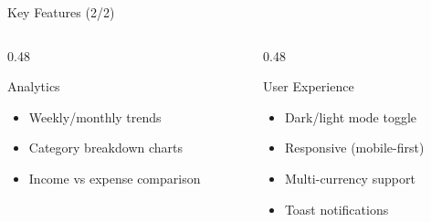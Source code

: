 \documentclass[aspectratio=169, 12pt]{beamer}
\begin{document}
\begin{frame}{Key Features (2/2)}

\begin{columns}[T]
\begin{column}{0.48\textwidth}
\begin{block}{Analytics}
\begin{itemize}\itemsep=0pt
    \item Weekly/monthly trends
    \item Category breakdown charts
    \item Income vs expense comparison
\end{itemize}
\end{block}
\end{column}
\begin{column}{0.48\textwidth}
\begin{block}{User Experience}
\begin{itemize}\itemsep=0pt
    \item Dark/light mode toggle
    \item Responsive (mobile-first)
    \item Multi-currency support
    \item Toast notifications
\end{itemize}
\end{block}
\end{column}
\end{columns}
\end{frame}
\end{document}
